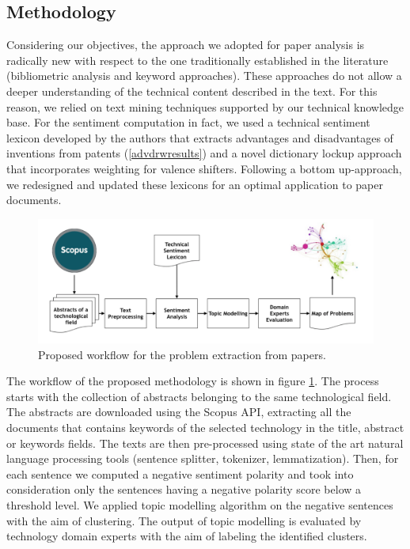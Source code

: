 \documentclass[b5paper,]{book}
\theoremstyle{definition}
\theoremstyle{definition}
\theoremstyle{definition}
\theoremstyle{remark}
\begin{document}
\subsection{Methodology}\label{methodology-4}

Considering our objectives, the approach we adopted for paper analysis
is radically new with respect to the one traditionally established in
the literature (bibliometric analysis and keyword approaches). These
approaches do not allow a deeper understanding of the technical content
described in the text. For this reason, we relied on text mining
techniques supported by our technical knowledge base. For the sentiment
computation in fact, we used a technical sentiment lexicon developed by
the authors that extracts advantages and disadvantages of inventions
from patents (\ref{advdrwresults}) and a novel dictionary lockup
approach that incorporates weighting for valence shifters. Following a
bottom up-approach, we redesigned and updated these lexicons for an
optimal application to paper documents.

\begin{figure}

{\centering \includegraphics[width=0.8\linewidth]{_bookdown_files/figures/bcworkflow} 

}

\caption{Proposed workflow for the problem extraction from papers. }\label{fig:bcworkflow}
\end{figure}

The workflow of the proposed methodology is shown in figure
\ref{fig:bcworkflow}. The process starts with the collection of
abstracts belonging to the same technological field. The abstracts are
downloaded using the Scopus API, extracting all the documents that
contains keywords of the selected technology in the title, abstract or
keywords fields. The texts are then pre-processed using state of the art
natural language processing tools (sentence splitter, tokenizer,
lemmatization). Then, for each sentence we computed a negative sentiment
polarity and took into consideration only the sentences having a
negative polarity score below a threshold level. We applied topic
modelling algorithm on the negative sentences with the aim of
clustering. The output of topic modelling is evaluated by technology
domain experts with the aim of labeling the identified clusters.
\end{document}
